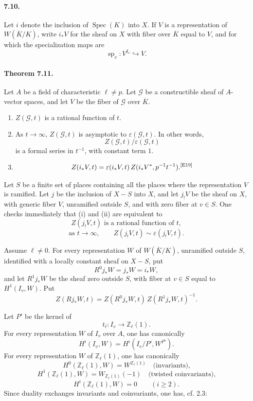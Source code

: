 \documentclass[10pt,letterpaper]{article}
\newcommand{\Spec}{\operatorname{Spec}}
\providecommand{\spc}{\operatorname{sp}}
\providecommand{\Spec}{\operatorname{Spec}}
\providecommand{\spc}{\operatorname{sp}}
\providecommand{\Spec}{\operatorname{Spec}}
\providecommand{\Spec}{\operatorname{Spec}}
\providecommand{\spc}{\operatorname{sp}}
\newcommand{\auditmark}[1]{\textsuperscript{\normalfont\scriptsize[E#1]}}
\begin{document}
\paragraph{7.10.} Let \(i\) denote the inclusion of \(\Spec(K)\) into \(X\). If \(V\) is a representation of \(W(\overline K/K)\), write \(i_*V\) for the sheaf on \(X\) with fiber over \(\overline K\) equal to \(V\), and for which the specialization maps are
\[
\spc_v:V^{I_v}\hookrightarrow V.
\]

\paragraph{Theorem 7.11.} Let \(A\) be a field of characteristic \(\ell\ne p\). Let \(\mathcal G\) be a constructible sheaf of \(A\)-vector spaces, and let \(V\) be the fiber of \(\mathcal G\) over \(\overline K\).
\begin{enumerate}[label=(\roman*)]
\item \(Z(\mathcal G,t)\) is a rational function of \(t\).
\item As \(t\to\infty\), \(Z(\mathcal G,t)\) is asymptotic to \(\varepsilon(\mathcal G,t)\). In other words,
\[
Z(\mathcal G,t)/\varepsilon(\mathcal G,t)
\]
is a formal series in \(t^{-1}\), with constant term \(1\).
\item
\[
Z(i_*V,t)=\varepsilon(i_*V,t)\,Z(i_*V^*,p^{-1}t^{-1}).\auditmark{19}
\]
\end{enumerate}

Let \(S\) be a finite set of places containing all the places where the representation \(V\) is ramified. Let \(j\) be the inclusion of \(X-S\) into \(X\), and let \(j_!V\) be the sheaf on \(X\), with generic fiber \(V\), unramified outside \(S\), and with zero fiber at \(v\in S\). One checks immediately that (i) and (ii) are equivalent to
\[
\tag{i'}
Z(j_!V,t)\text{ is a rational function of }t,
\]
\[
\tag{ii'}
\text{as }t\to\infty,\qquad Z(j_!V,t)\sim\varepsilon(j_!V,t).
\]

Assume \(\ell\ne0\). For every representation \(W\) of \(W(\overline K/K)\), unramified outside \(S\), identified with a locally constant sheaf on \(X-S\), put
\[
R^0j_*W=j_*W=i_*W,
\]
and let \(R^1j_*W\) be the sheaf zero outside \(S\), with fiber at \(v\in S\) equal to \(H^1(I_v,W)\). Put
\[
\tag{7.11.1}
Z(Rj_*W,t)=Z(R^0j_*W,t)\,Z(R^1j_*W,t)^{-1}.
\]

Let \(P'\) be the kernel of
\[
t_\ell:I_v\longrightarrow \mathbb Z_\ell(1).
\]
For every representation \(W\) of \(I_v\) over \(A\), one has canonically
\[
\tag{7.11.2}
H^i(I_v,W)=H^i(I_v/P',W^{P'}).
\]
For every representation \(W\) of \(\mathbb Z_\ell(1)\), one has canonically
\[
\tag{7.11.3}
H^0(\mathbb Z_\ell(1),W)=W^{\mathbb Z_\ell(1)}
\quad\text{(invariants),}
\]
\[
H^1(\mathbb Z_\ell(1),W)=W_{\mathbb Z_\ell(1)}(-1)
\quad\text{(twisted coinvariants),}
\]
\[
H^i(\mathbb Z_\ell(1),W)=0\qquad(i\ge2).
\]
Since duality exchanges invariants and coinvariants, one has, cf. 2.3:
\end{document}
